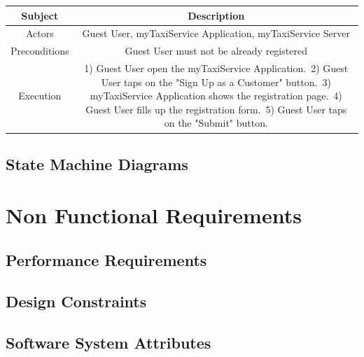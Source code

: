 \documentclass{report}
\begin{document}
				\begin{center}
						\begin{table}[h!]
							
							\begin{center}
								\label{tab:NormalCustomerRegistrationDiagramTable}
								\begin{tabular}{cc}
									\toprule
									\textbf{Subject} & \textbf{Description}\\
									\midrule
									Actors & Guest User, myTaxiService Application, myTaxiService Server\\
									\midrule
									Preconditions & Guest User must not be already registered\\
									\midrule
									Execution & 1) Guest User open the myTaxiService Application.\
												2) Guest User taps on the "Sign Up as a Customer" button.\
												3) myTaxiService Application shows the registration page.\
												4) Guest User fills up the registration form.\
												5) Guest User taps on the "Submit" button.\\
									\midrule
									
									\bottomrule
								\end{tabular}
							\end{center}
							
						\end{table}
					\end{center}

		\subsection{State Machine Diagrams}

	\section{Non Functional Requirements}

		\subsection{Performance Requirements}

		\subsection{Design Constraints}

		\subsection{Software System Attributes}
\end{document}
